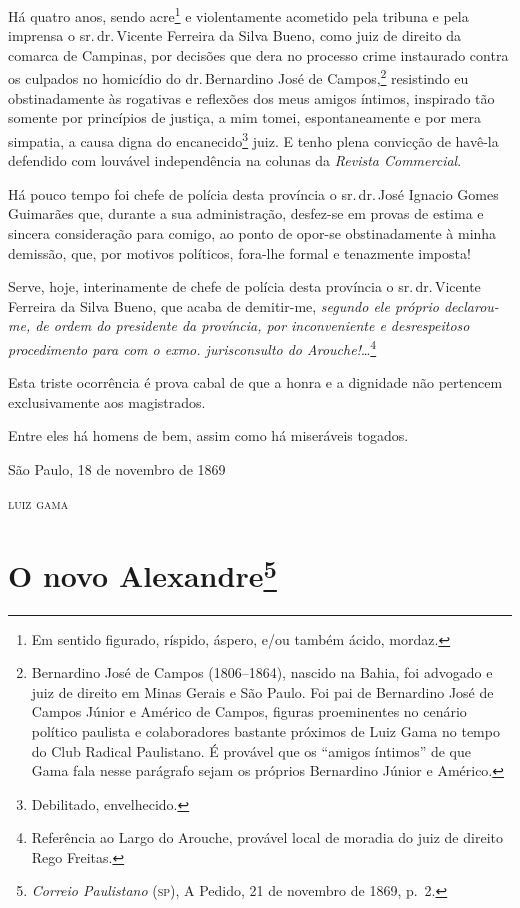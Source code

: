 Há quatro anos, sendo acre\footnote{Em sentido figurado, ríspido,
  áspero, e/ou também ácido, mordaz.} e violentamente acometido pela
tribuna e pela imprensa o sr.\,dr.\,Vicente Ferreira da Silva Bueno, como
juiz de direito da comarca de Campinas, por decisões que dera no
processo crime instaurado contra os culpados no homicídio do dr.\,Bernardino José de Campos,\footnote{Bernardino José de Campos
  (1806--1864), nascido na Bahia, foi advogado e juiz de direito em Minas
  Gerais e São Paulo. Foi pai de Bernardino José de Campos Júnior e
  Américo de Campos, figuras proeminentes no cenário político paulista e
  colaboradores bastante próximos de Luiz Gama no tempo do Club Radical
  Paulistano. É provável que os ``amigos íntimos'' de que Gama fala nesse
  parágrafo sejam os próprios Bernardino Júnior e Américo.} resistindo
eu obstinadamente às rogativas e reflexões dos meus amigos íntimos,
inspirado tão somente por princípios de justiça, a mim tomei,
espontaneamente e por mera simpatia, a causa digna do
encanecido\footnote{Debilitado, envelhecido.} juiz. E tenho plena
convicção de havê-la defendido com louvável independência na colunas da
\emph{Revista Commercial}.

Há pouco tempo foi chefe de polícia desta província o sr.\,dr.\,José
Ignacio Gomes Guimarães que, durante a sua administração, desfez-se em
provas de estima e sincera consideração para comigo, ao ponto de opor-se
obstinadamente à minha demissão, que, por motivos políticos, fora-lhe
formal e tenazmente imposta!

Serve, hoje, interinamente de chefe de polícia desta província o sr.\,dr.\,Vicente Ferreira da Silva Bueno, que acaba de demitir-me, \emph{segundo
ele próprio declarou-me, de ordem do presidente da província, por
inconveniente e desrespeitoso procedimento para com o exmo.
jurisconsulto do Arouche!}\ldots{}\footnote{Referência ao Largo do Arouche,
  provável local de moradia do juiz de direito Rego Freitas.}

Esta triste ocorrência é prova cabal de que a honra e a dignidade não
pertencem exclusivamente aos magistrados.

Entre eles há homens de bem, assim como há miseráveis togados.

\begin{flushright}
São Paulo, 18 de novembro de 1869

\textsc{luiz gama}
\end{flushright}

\chapter{O novo Alexandre\footnote{\emph{Correio Paulistano} (\textsc{sp}), A
  Pedido, 21 de novembro de 1869, p.~2.}}


